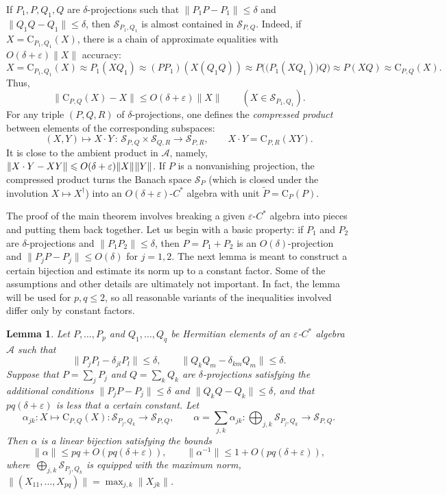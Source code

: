 \documentclass[12pt]{article}
\newcommand{\calA}{\mathcal{A}}
\newcommand{\calS}{\mathcal{S}}
\newcommand{\ts}{\mkern1mu}
\newcommand{\Co}{\mathrm{C}}
\newcommand{\wt}{\widetilde}
\newcommand{\eps}{\varepsilon}
\renewcommand{\le}{\leqslant}
\newtheorem{Lemma}[Theorem]{Lemma}
\newtheorem[definition]{Definition}[Theorem]{Definition}
\newtheorem[remark]{Example}[Theorem]{Example}
\newtheorem[remark]{Remark}[Theorem]{Remark}
\newtheorem[remark]{Question}[Theorem]{Open question}
\newtheorem*[definition]{definition}{Definition}
\newtheorem*[remark]{example}{Example}
\newtheorem*[remark]{remark}{Remark}
\newtheorem*[remark]{question}{Open question}
\numberwithin{equation}{section}
\begin{document}
If $P_1,P,Q_1,Q$ are $\delta$-projections such that $\|P_1P-P_1\|\le\delta$ and $\|Q_1Q-Q_1\|\le\delta$, then  $\calS_{P_1,Q_1}$ is almost contained in $\calS_{P,Q}$. Indeed, if $X=\Co_{P_1,Q_1}(X)$, there is a chain of approximate equalities with $O(\delta+\eps)\|X\|$ accuracy:
\[
X= \Co_{P_1,Q_1}(X)\approx P_1(XQ_1)\approx (PP_1)(X(Q_1Q))\approx
P\bigl(\bigl(P_1(XQ_1)\bigr)Q\bigr)\approx P(XQ)\approx \Co_{P,Q}(X).
\]
Thus,
\begin{equation}\label{almost_inc}
\|\Co_{P,Q}(X)-X\|\le O(\delta+\eps)\|X\|\qquad (X\in\calS_{P_1,Q_1}).
\end{equation}
For any triple $(P,Q,R)$ of $\delta$-projections, one defines the \emph{compressed product} between elements of the corresponding subspaces:
\begin{equation}\label{compr_prod}
(X,Y)\mapsto X\cdot Y\,\colon\,
\calS_{P,Q}\times\calS_{Q,R}\to \calS_{P,R},\qquad X\cdot Y=\Co_{P,R}(XY).
\end{equation}
It is close to the ambient product in $\calA$, namely, $\|X\cdot Y-XY\|\le O(\delta+\eps)\|X\|\ts\|Y\|$. If $P$ is a nonvanishing projection, the compressed product turns the Banach space $\calS_P$ (which is closed under the involution $X\mapsto X^\dag$) into an $O(\delta+\eps)$-$C^*$ algebra with unit $\wt{P}=\Co_{P}(P)$.\medskip

The proof of the main theorem involves breaking a given $\eps$-$C^*$ algebra into pieces and putting them back together. Let us begin with a basic property: if $P_1$ and $P_2$ are $\delta$-projections and $\|P_1P_2\|\le\delta$, then $P=P_1+P_2$ is an $O(\delta)$-projection and $\|P_jP-P_j\|\le O(\delta)$ for $j=1,2$. The next lemma is meant to construct a certain bijection and estimate its norm up to a constant factor. Some of the assumptions and other details are ultimately not important. In fact, the lemma will be used for $p,q\le 2$, so all reasonable variants of the inequalities involved differ only by constant factors.

\begin{Lemma}\label{lem_alpha}
Let $P,\dots,P_p$ and $Q_1,\dots,Q_q$ be Hermitian elements of an $\eps$-$C^*$ algebra $\calA$ such that
\[
\|P_jP_l-\delta_{jl}P_l\|\le\delta,\qquad \|Q_kQ_m-\delta_{km}Q_m\|\le\delta.
\]
Suppose that $P=\sum_jP_j$ and $Q=\sum_kQ_k$ are $\delta$-projections satisfying the additional conditions $\|P_jP-P_j\|\le\delta$ and $\|Q_kQ-Q_k\|\le\delta$, and that $pq(\delta+\eps)$ is less that a certain constant. Let
\begin{equation}\label{alpha_jk}
\alpha_{jk}\colon X\mapsto\Co_{P,Q}(X)\colon\calS_{P_j,Q_k}\to\calS_{P,Q},\qquad
\alpha=\sum_{j,k}\alpha_{jk}\colon \bigoplus_{j,k}\calS_{P_j,Q_k}\to\calS_{P,Q}.
\end{equation}
Then $\alpha$ is a linear bijection satisfying the bounds
\begin{equation}
\|\alpha\|\le pq+O(pq(\delta+\eps)),\qquad
\|\alpha^{-1}\|\le 1+O(pq(\delta+\eps)),
\end{equation}
where\, $\bigoplus_{j,k}\calS_{P_j,Q_k}$ is equipped with the maximum norm, $\|(X_{11},\dots,X_{pq})\|=\max_{j,k}\|X_{jk}\|$.
\end{Lemma}
\end{document}

